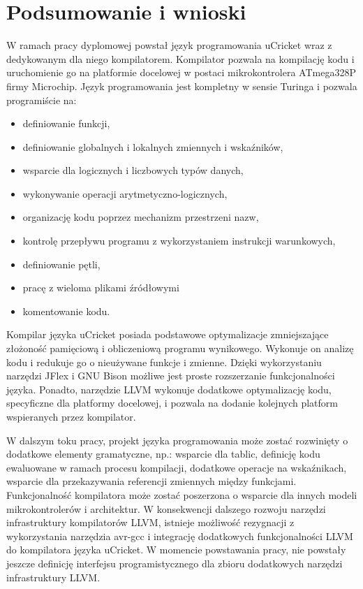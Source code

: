 \chapter{Podsumowanie i wnioski}

W ramach pracy dyplomowej powstał język programowania uCricket wraz z dedykowanym dla niego kompilatorem. Kompilator pozwala na kompilację kodu i uruchomienie go na platformie docelowej w postaci mikrokontrolera ATmega328P firmy Microchip.
Język programowania jest kompletny w sensie Turinga i pozwala programiście na:
\begin{itemize}
\item definiowanie funkcji,
\item definiowanie globalnych i lokalnych zmiennych i wskaźników,
\item wsparcie dla logicznych i liczbowych typów danych,
\item wykonywanie operacji arytmetyczno-logicznych,
\item organizację kodu poprzez mechanizm przestrzeni nazw,
\item kontrolę przepływu programu z wykorzystaniem instrukcji warunkowych,
\item definiowanie pętli,
\item pracę z wieloma plikami źródłowymi
\item komentowanie kodu.
\end{itemize}
Kompilar języka uCricket posiada podstawowe optymalizacje zmniejszające złożoność pamięciową i obliczeniową programu wynikowego. Wykonuje on analizę kodu i redukuje go o nieużywane funkcje i zmienne. 
Dzięki wykorzystaniu narzędzi JFlex i GNU Bison możliwe jest proste rozszerzanie funkcjonalności języka. Ponadto, narzędzie LLVM wykonuje dodatkowe optymalizację kodu, specyficzne dla platformy docelowej, i pozwala na dodanie kolejnych platform wspieranych przez kompilator.

W dalszym toku pracy, projekt języka programowania może zostać rozwinięty o dodatkowe elementy gramatyczne, np.: wsparcie dla tablic, definicję kodu ewaluowane w ramach procesu kompilacji, dodatkowe operacje na wskaźnikach, wsparcie dla przekazywania referencji zmiennych między funkcjami.
Funkcjonalność kompilatora może zostać poszerzona o wsparcie dla innych modeli mikrokontrolerów i architektur. W konsekwencji dalszego rozwoju narzędzi infrastruktury kompilatorów LLVM, istnieje możliwość rezygnacji z wykorzystania narzędzia avr-gcc i integrację dodatkowych funkcjonalności LLVM do kompilatora języka uCricket. W momencie powstawania pracy, nie powstały jeszcze definicję interfejsu programistycznego dla zbioru dodatkowych narzędzi infrastruktury LLVM.


